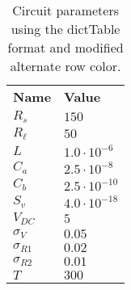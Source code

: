 \begin{table}[H]
\centering
\begin{tabular}[c]{ll}
\textbf{Name} & \textbf{Value} \\ 
\rowcolor{mygray}
$R_{s}$ &$150$ \\ 
$R_{\ell}$ &$50$ \\ 
\rowcolor{mygray}
$L$ &$1.0 \cdot 10^{-6}$ \\ 
$C_{a}$ &$2.5 \cdot 10^{-8}$ \\ 
\rowcolor{mygray}
$C_{b}$ &$2.5 \cdot 10^{-10}$ \\ 
$S_{v}$ &$4.0 \cdot 10^{-18}$ \\ 
\rowcolor{mygray}
$V_{DC}$ &$5$ \\ 
$\sigma_{V}$ &$0.05$ \\ 
\rowcolor{mygray}
$\sigma_{R1}$ &$0.02$ \\ 
$\sigma_{R2}$ &$0.01$ \\ 
\rowcolor{mygray}
$T$ &$300$ \\ 
\end{tabular}
\caption{Circuit parameters using the dictTable format and modified alternate row color.}
\label{tab-mydct}
\end{table}


